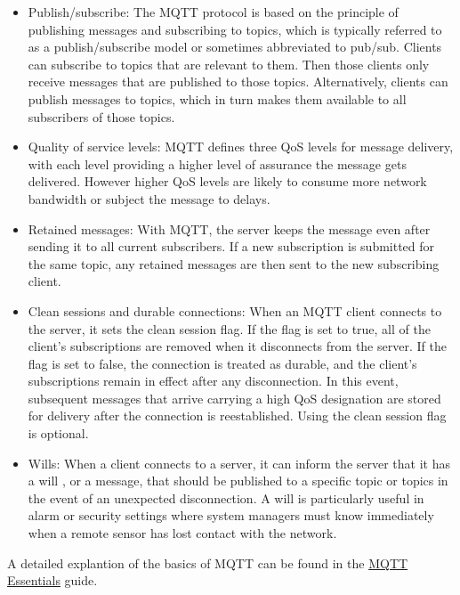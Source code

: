 \begin{itemize}
\item Publish/subscribe: The \ac{MQTT} protocol is based on the principle of publishing messages and subscribing to topics, which is typically referred to as a publish/subscribe model or sometimes abbreviated to pub/sub. Clients can subscribe to topics that are relevant to them. Then those clients only receive messages that are published to those topics. Alternatively, clients can publish messages to topics, which in turn makes them available to all subscribers of those topics.
\item Quality of service levels: \ac{MQTT} defines three \ac{QoS} levels for message delivery, with each level providing a higher level of assurance the message gets delivered. However higher \ac{QoS} levels are likely to consume more network bandwidth or subject the message to delays.
\item Retained messages: With \ac{MQTT}, the server keeps the message even after sending it to all current subscribers. If a new subscription is submitted for the same topic, any retained messages are then sent to the new subscribing client.
\item Clean sessions and durable connections: When an \ac{MQTT} client connects to the server, it sets the clean session flag. If the flag is set to true, all of the client’s subscriptions are removed when it disconnects from the server. If the flag is set to false, the connection is treated as durable, and the client’s subscriptions remain in effect after any disconnection. In this event, subsequent messages that arrive carrying a high \ac{QoS} designation are stored for delivery after the connection is reestablished. Using the clean session flag is optional.
\item Wills: When a client connects to a server, it can inform the server that it has a will , or a message, that should be published to a specific topic or topics in the event of an unexpected disconnection. A will is particularly useful in alarm or security settings where system managers must know immediately when a remote sensor has lost contact with the network.
\end{itemize}
A detailed explantion of the basics of MQTT can be found in the \href{https://www.hivemq.com/mqtt-essentials/}{MQTT Essentials} guide.
